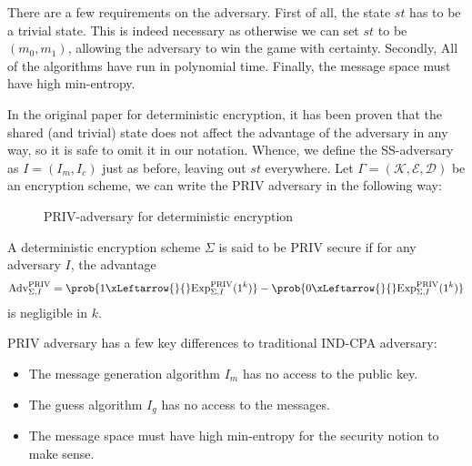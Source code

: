 There are a few requirements on the adversary. First of all, the state $st$ has to be a trivial state. This is indeed necessary as otherwise we can set $st$ to be $(m_0, m_1)$, allowing the adversary to win the game with certainty. Secondly, All of the algorithms have run in polynomial time. Finally, the message space must have high min-entropy.

In the original paper for deterministic encryption, it has been proven that the shared (and trivial) state does not affect the advantage of the adversary in any way, so it is safe to omit it in our notation. Whence, we define the SS-adversary as $I = (I_m, I_c)$ just as before, leaving out $st$ everywhere. Let $\Gamma = (\mathcal{K}, \mathcal{E}, \mathcal{D})$ be an encryption scheme, we can write the PRIV adversary in the following way:

\begin{figure}[H]
\begin{center}
\end{center}
\caption{PRIV-adversary for deterministic encryption}
\end{figure}

A deterministic encryption scheme $\Sigma$ is said to be PRIV secure if for any adversary $I$, the advantage
\begin{equation*}
	\text{Adv}_{\Sigma, I}^{\text{PRIV}} = \prob{1 \xLeftarrow{}{} \text{Exp}_{\Sigma, I}^{\text{PRIV}}(1^k)} - \prob{0 \xLeftarrow{}{} \text{Exp}_{\Sigma, I}^{\text{PRIV}}(1^k)}
\end{equation*}
is negligible in $k$.


PRIV adversary has a few key differences to traditional IND-CPA adversary:
\begin{itemize}
\item The message generation algorithm $I_m$ has no access to the public key.
\item The guess algorithm $I_g$ has no access to the messages.
\item The message space must have high min-entropy for the security notion to make sense.
\end{itemize}




